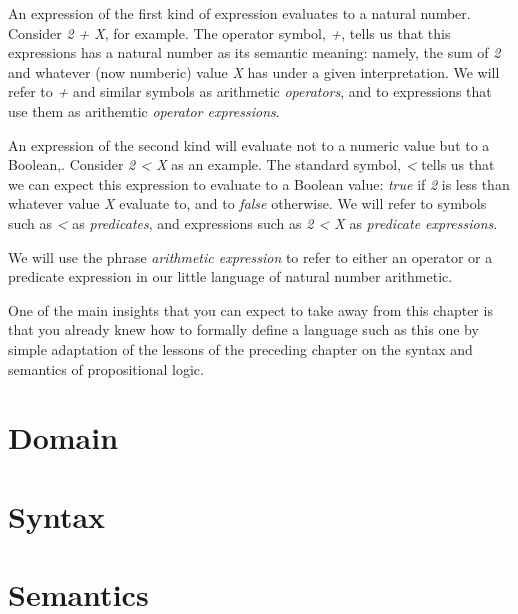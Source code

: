 \documentclass{book}
\begin{document}
An expression of the first kind of expression evaluates
to a natural number. Consider \emph{2 + X}, for example. The
operator symbol, \emph{+}, tells us that this expressions has
a natural number as its semantic meaning: namely, the sum
of \emph{2} and whatever (now numberic) value \emph{X} has under a
given interpretation. We will refer to \emph{+} and similar
symbols as arithmetic \emph{operators}, and to expressions
that use them as arithemtic \emph{operator expressions}.

An expression of the second kind will evaluate not to a
numeric value but to a Boolean,. Consider \emph{2 \textless{} X} as an
example. The standard symbol, \emph{\textless{}} tells us that we can
expect this expression to evaluate to a Boolean value:
\emph{true} if \emph{2} is less than whatever value \emph{X} evaluate
to, and to \emph{false} otherwise. We will refer to symbols
such as \emph{\textless{}} as \emph{predicates}, and expressions such as
\emph{2 \textless{} X} as \emph{predicate expressions}.

We will use the phrase \emph{arithmetic expression} to refer
to either an operator or a predicate expression in our
little language of natural number arithmetic.

One of the main insights that you can expect to take
away from this chapter is that you already knew how to
formally define a language such as this one by simple
adaptation of the lessons of the preceding chapter on
the syntax and semantics of propositional logic.

\hypertarget{book__pandoc__debug__src__dmt1__lectures__l04_natarithmetic__domain.lean.md}{}
\hypertarget{book__pandoc__debug__src__dmt1__lectures__l04_natarithmetic__domain.lean.md__domain}{%
\section{Domain}\label{book__pandoc__debug__src__dmt1__lectures__l04_natarithmetic__domain.lean.md__domain}}

\hypertarget{book__pandoc__debug__src__dmt1__lectures__l04_natarithmetic__syntax.lean.md}{}
\hypertarget{book__pandoc__debug__src__dmt1__lectures__l04_natarithmetic__syntax.lean.md__syntax}{%
\section{Syntax}\label{book__pandoc__debug__src__dmt1__lectures__l04_natarithmetic__syntax.lean.md__syntax}}

\hypertarget{book__pandoc__debug__src__dmt1__lectures__l04_natarithmetic__semantics.lean.md}{}
\hypertarget{book__pandoc__debug__src__dmt1__lectures__l04_natarithmetic__semantics.lean.md__semantics}{%
\section{Semantics}\label{book__pandoc__debug__src__dmt1__lectures__l04_natarithmetic__semantics.lean.md__semantics}}
\end{document}
